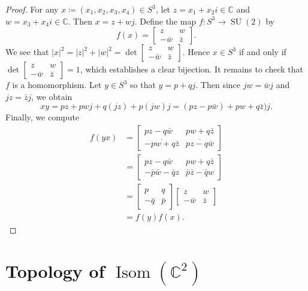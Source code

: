 \documentclass[10pt,letterpaper,cm]{nupset}
\theoremstyle{definition}
\theoremstyle{theorem}
\theoremstyle{remark}
\newcommand{\C}{\mathbb C}
\newcommand{\1}{\mathbf{1}}
\newcommand{\0}{\vec {0}}
\DeclareMathOperator{\Isom}{Isom}
\DeclareMathOperator{\SU}{SU}
\begin{document}
\begin{proof}
For any $x\coloneqq \left(x_1, x_2, x_3, x_4\right) \in S^3$, let $z=x_1+x_2i\in \C$ and $w=x_3+x_4i\in \C$. Then $x=z+wj$. Define the map $f: S^3\to \SU(2)$ by $$f(x)= \begin{bmatrix} z & w\\ {-\bar{w}} & \bar{z} \end{bmatrix}.$$ We see that $|x|^2=|z|^2+|w|^2=\det{\begin{bmatrix} z & w\\ {-\bar{w}} & \bar{z} \end{bmatrix}}$. Hence $x\in S^3$ if and only if $\det{\begin{bmatrix} z & w\\ {-\bar{w}} & \bar{z} \end{bmatrix}}=1$, which establishes a clear bijection. It remains to check that $f$ is a homomorphism. Let $y\in S^3$ so that $y=p+qj$. Then since $jw=\bar{w}j$ and $jz=\bar{z}j$, we obtain $$xy=pz+pwj+q(jz)+p(jw)j=(pz-p\bar{w})+pw+q\bar{z})j.$$ Finally, we compute 
\begin{align*}
f(yx)& =\begin{bmatrix} {pz-q\bar{w}}&  {pw+q\bar{z}} \\ \overline{-pw+q\bar{z}} & \overline{pz-q\bar{w}} \end{bmatrix}\\ & =\begin{bmatrix} {pz-q\bar{w}}&  {pw+q\bar{z}} \\ {-\bar{p}\bar{w}-\bar{q}{z}} & {\bar{p}\bar{z}-\bar{q}{w}} \end{bmatrix}\\ & =\begin{bmatrix} p & q \\ {-\bar{q}} & \bar{p}\end{bmatrix}\begin{bmatrix} z & w \\ {-\bar{w}} & \bar{z}\end{bmatrix}
\\ & =f(y)f(x).
\end{align*}
\end{proof}

\section{Topology of $\Isom(\C^2)$}
\end{document}
